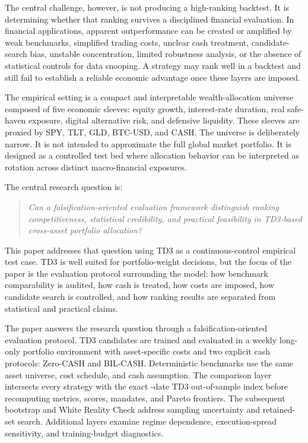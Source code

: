 \documentclass[11pt]{article}
\newcommand{\cashzero}{Zero-CASH}
\newcommand{\cashbil}{BIL-CASH}
\begin{document}
The central challenge, however, is not producing a high-ranking backtest. It is determining whether that ranking survives a disciplined financial evaluation. In financial applications, apparent outperformance can be created or amplified by weak benchmarks, simplified trading costs, unclear cash treatment, candidate-search bias, unstable concentration, limited robustness analysis, or the absence of statistical controls for data snooping. A strategy may rank well in a backtest and still fail to establish a reliable economic advantage once these layers are imposed.

The empirical setting is a compact and interpretable wealth-allocation universe composed of five economic sleeves: equity growth, interest-rate duration, real safe-haven exposure, digital alternative risk, and defensive liquidity. These sleeves are proxied by SPY, TLT, GLD, BTC-USD, and CASH. The universe is deliberately narrow. It is not intended to approximate the full global market portfolio. It is designed as a controlled test bed where allocation behavior can be interpreted as rotation across distinct macro-financial exposures.

The central research question is:

\begin{quote}
\emph{Can a falsification-oriented evaluation framework distinguish ranking competitiveness, statistical credibility, and practical feasibility in TD3-based cross-asset portfolio allocation?}
\end{quote}

This paper addresses that question using TD3 as a continuous-control empirical test case. TD3 is well suited for portfolio-weight decisions, but the focus of the paper is the evaluation protocol surrounding the model: how benchmark comparability is audited, how cash is treated, how costs are imposed, how candidate search is controlled, and how ranking results are separated from statistical and practical claims.

The paper answers the research question through a falsification-oriented evaluation protocol. TD3 candidates are trained and evaluated in a weekly long-only portfolio environment with asset-specific costs and two explicit cash protocols: \cashzero{} and \cashbil{}. Deterministic benchmarks use the same asset universe, cost schedule, and cash assumption. The comparison layer intersects every strategy with the exact \AlignedWeeks{}-date TD3 out-of-sample index before recomputing metrics, scores, mandates, and Pareto frontiers. The subsequent bootstrap and White Reality Check address sampling uncertainty and retained-set search. Additional layers examine regime dependence, execution-spread sensitivity, and training-budget diagnostics.
\end{document}
